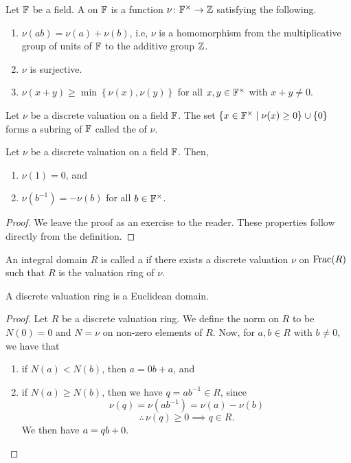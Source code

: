 \begin{defn}
    Let $\mathbb{F}$ be a field. A  on $\mathbb{F}$ is a function $\nu \colon \mathbb{F}^{\times} \to \mathbb{Z}$ satisfying the following.
    \begin{enumerate}
        \item $\nu(ab) = \nu(a) + \nu(b)$, i.e, $\nu$ is a homomorphism from the multiplicative group of units of $\mathbb{F}$ to the additive group $\mathbb{Z}$.
        \item $\nu$ is surjective.
        \item $\nu(x+y) \geq \min\left\{ \nu(x), \nu(y) \right\}$ for all $x,y \in \mathbb{F}^{\times}$ with $x+y \neq 0$.
    \end{enumerate}
\end{defn}
\begin{defn}
    Let $\nu$ be a discrete valuation on a field $\mathbb{F}$. The set $\left\{ x \in \mathbb{F}^{\times} \mid \nu(x) \geq 0 \right\} \cup \{0\}$ forms a subring of $\mathbb{F}$ called the  of $\nu$.
\end{defn}
\begin{prop}
    Let $\nu$ be a discrete valuation on a field $\mathbb{F}$. Then, 
    \begin{enumerate}
        \item $\nu(1) = 0$, and
        \item $\nu(b^{-1}) = -\nu(b)$ for all $b \in \mathbb{F}^{\times}$.
    \end{enumerate}
\end{prop}
\begin{proof}
    We leave the proof as an exercise to the reader. These properties follow directly from the definition.
\end{proof}
\begin{defn}
    An integral domain $R$ is called a  if there exists a discrete valuation $\nu$ on $\operatorname{Frac}(R)$ such that $R$ is the valuation ring of $\nu$.
\end{defn}
\begin{prop}
    A discrete valuation ring is a Euclidean domain.
\end{prop}
\begin{proof}
    Let $R$ be a discrete valuation ring. We define the norm on $R$ to be $N(0) = 0$ and $N = \nu$ on non-zero elements of $R$. Now, for $a,b \in R$ with $b \neq 0$, we have that
    \begin{enumerate}
        \item if $N(a) < N(b)$, then $a = 0b + a$, and
        \item if $N(a) \geq N(b)$, then we have $q = ab^{-1} \in R$, since 
        \[
            \nu(q) = \nu(ab^{-1}) = \nu(a) - \nu(b)
        \]
        \[
            \therefore \, \nu(q) \geq 0 \implies q \in R.
        \]
        We then have $a = qb + 0. \hfill\qedhere$
    \end{enumerate}
\end{proof}

